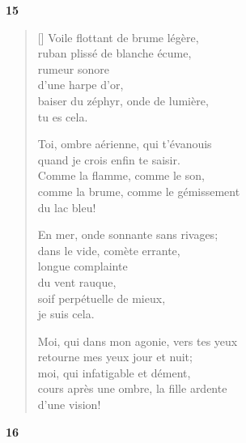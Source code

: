 \documentclass[a4paper,12pt]{book}
\begin{document}
\bigskip

\begin{center}
  \textbf{15}
\end{center}

\settowidth{\versewidth}{Moi, qui dans mon agonie, vers tes yeux}

\begin{verse}[\versewidth]
  Voile flottant de brume légère, \\
  ruban plissé de blanche écume, \\
  rumeur sonore \\
  d'une harpe d'or, \\
  baiser du zéphyr, onde de lumière, \\
  tu es cela.

  Toi, ombre aérienne, qui t'évanouis \\
  quand je crois enfin te saisir. \\
  Comme la flamme, comme le son, \\
  comme la brume, comme le gémissement \\
  du lac bleu!

  En mer, onde sonnante sans rivages; \\
  dans le vide, comète errante, \\
  longue complainte \\
  du vent rauque, \\
  soif perpétuelle de mieux, \\
  je suis cela.

  Moi, qui dans mon agonie, vers tes yeux \\
  retourne mes yeux jour et nuit; \\
  moi, qui infatigable et dément, \\
  cours après une ombre, la fille ardente \\
  d'une vision!
\end{verse}

\bigskip

\begin{center}
  \textbf{16}
\end{center}

\settowidth{\versewidth}{Si, quand les clochettes bleues de ton balcon}
\end{document}
